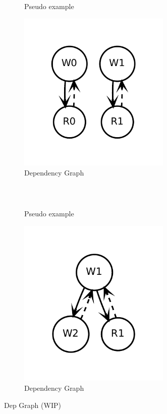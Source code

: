 \begin{figure}
\centering

\begin{subfigure}[b]{0.5\textwidth}
\inputminted{python}{code/dep1.py}
\caption{Pseudo example}
\end{subfigure}
\begin{subfigure}[b]{0.3\textwidth}
  \centering
\includegraphics[width=0.8\textwidth]{figs/dep1.pdf}
\caption{Dependency Graph}
\end{subfigure}
\\
\begin{subfigure}[b]{0.5\textwidth}
\inputminted{python}{code/dep3.py}
\caption{Pseudo example}
\end{subfigure}
\begin{subfigure}[b]{0.3\textwidth}
  \centering
\includegraphics[width=0.8\textwidth]{figs/dep3.pdf}
\caption{Dependency Graph}
\end{subfigure}

\caption[Dep Graph]{
  Dep Graph (WIP)
}
\label{fig:depexp}
\end{figure}

